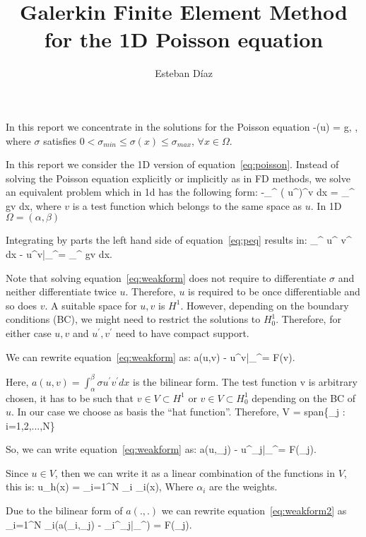 \documentclass[10pt]{article}
\author{Esteban D\'{i}az}
\title{Galerkin Finite Element Method for the 1D Poisson equation}{}
\def\up#1{ #1^{\prime}}
\def\intab#1{\int_{\alpha}^{\beta} #1 dx}
\def\evat{\bigg|_{\alpha}^{\beta}}
\begin{document}


\maketitle
In this report we concentrate in the solutions for the Poisson equation
\beq
-\nabla\cdot(\sigma\nabla u) = g, \Omega,
\label{eq:poisson}
\eeq
where $\sigma$ satisfies $0<\sigma_{min} \leq\sigma(x) \leq \sigma_{max}$, $\forall x \in \Omega$.

In this report we consider the 1D version of equation~\ref{eq:poisson}. Instead of solving the Poisson equation
explicitly or implicitly as in FD methods, we solve an equivalent problem which in 1d has the following form:
\beq
-\intab{ \up{\left(\sigma\up{u}\right)}v} = \intab{gv},
\label{eq:peq}
\eeq
where $v$ is a test function which belongs to the same space as $u$. In 1D $\Omega =(\alpha,\beta)$

Integrating by parts the left hand side of equation~\ref{eq:peq} results in:
\beq
\intab{ \sigma\up{u} \up{v} } - \sigma\up{u}v\evat = \intab{gv}.
\label{eq:weakform}
\eeq

Note that solving equation~\ref{eq:weakform} does not require to differentiate $\sigma$ and neither differentiate twice $u$. 
Therefore, $u$ is required to be once differentiable and so does $v$. A suitable space for $u,v$ is $H^1$. However, depending 
on the boundary conditions (BC), we might need to restrict the solutions to $H^1_0$. Therefore, for either case
$u,v$ and $\up{u},\up{v}$ need to have compact support.

We can rewrite equation~\ref{eq:weakform} as:
\beq
a(u,v) -\sigma\up{u}{v}\evat = F(v).
\label{eq:weakform}
\eeq

Here, $a(u,v) = \intab{ \sigma\up{u} \up{v} }$ is the bilinear form.
The test function v is arbitrary chosen, it has to be such that $v \in V \subset H^1$ or $v \in V \subset H^1_0$ depending
on the BC of $u$. In our case we choose as basis the ``hat function''. Therefore,
\beq
V  = span\{\phi_j : i=1,2,...,N\}
\eeq

So, we can write equation~\ref{eq:weakform} as:
\beq
a(u,\phi_j) -\sigma\up{u}{\phi_j}\evat = F(\phi_j).
\label{eq:weakform2}
\eeq

Since $u \in V$, then we can write it as a linear combination of the functions in $V$, this is:
\beq
u_h(x) = \sum_{i=1}^{N} \alpha_i \phi_i(x),
\label{eq:lin}
\eeq
Where $\alpha_i$ are the weights.

Due to the bilinear form of $a(.,.)$ we can rewrite equation~\ref{eq:weakform2} as
\beq
\sum_{i=1}^{N} \alpha_i\left(a(\phi_i,\phi_j) -\sigma\up{\phi_i}{\phi_j}\evat\right) = F(\phi_j).
\label{eq:weakform3}
\eeq
\end{document}
